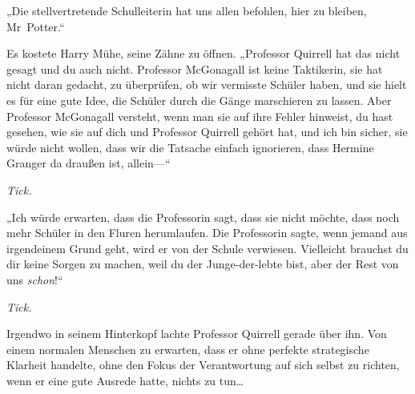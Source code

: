 „Die stellvertretende Schulleiterin hat uns allen befohlen, hier zu bleiben, Mr~Potter.“

Es kostete Harry Mühe, seine Zähne zu öffnen.
„Professor Quirrell hat das nicht gesagt und du auch nicht. Professor McGonagall ist keine Taktikerin, sie hat nicht daran gedacht, zu überprüfen, ob wir vermisste Schüler haben, und sie hielt es für eine gute Idee, die Schüler durch die Gänge marschieren zu lassen. Aber Professor McGonagall versteht, wenn man sie auf ihre Fehler hinweist, du hast gesehen, wie sie auf dich und Professor Quirrell gehört hat, und ich bin sicher, sie würde nicht wollen, dass wir die Tatsache einfach ignorieren, dass Hermine Granger da draußen ist, allein—“

\emph{Tick.}

„Ich würde erwarten, dass die Professorin sagt, dass sie nicht möchte, dass noch mehr Schüler in den Fluren herumlaufen. Die Professorin sagte, wenn jemand aus irgendeinem Grund geht, wird er von der Schule verwiesen. Vielleicht brauchst du dir keine Sorgen zu machen, weil du der Junge-der-lebte bist, aber der Rest von uns \emph{schon}!“

\emph{Tick.}

Irgendwo in seinem Hinterkopf lachte Professor Quirrell gerade über ihn. Von einem normalen Menschen zu erwarten, dass er ohne perfekte strategische Klarheit handelte, ohne den Fokus der Verantwortung auf sich selbst zu richten, wenn er eine gute Ausrede hatte, nichts zu tun…

